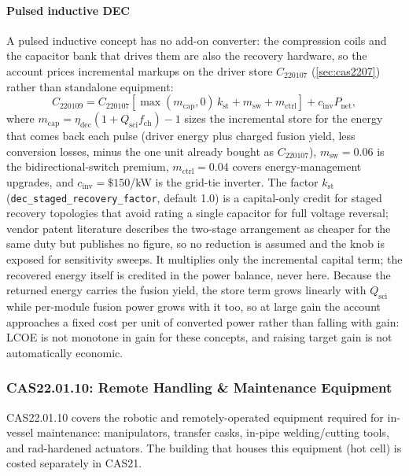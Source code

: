 \documentclass{article}
\begin{document}
\paragraph{Pulsed inductive DEC}
A pulsed inductive concept has no add-on converter: the compression
coils and the capacitor bank that drives them are also the recovery
hardware, so the account prices incremental markups on the driver store
$C_{220107}$ (\cref{sec:cas2207}) rather than standalone equipment:
\begin{equation}
\label{eq:cas2209-inductive}
  C_{220109} = C_{220107}\left[\max(m_{\text{cap}},0)\,k_{\text{st}}
  + m_{\text{sw}} + m_{\text{ctrl}}\right]
  + c_{\text{inv}} P_{\text{net}},
\end{equation}
where $m_{\text{cap}} = \eta_{\text{dec}}(1 + Q_{\text{sci}}
f_{\text{ch}}) - 1$ sizes the incremental store for the energy that
comes back each pulse (driver energy plus charged fusion yield, less
conversion losses, minus the one unit already bought as $C_{220107}$),
$m_{\text{sw}} = 0.06$ is the bidirectional-switch premium,
$m_{\text{ctrl}} = 0.04$ covers energy-management upgrades, and
$c_{\text{inv}} = \$150$/kW is the grid-tie inverter. The factor
$k_{\text{st}}$ (\texttt{dec\_staged\_recovery\_factor}, default 1.0)
is a capital-only credit for staged recovery topologies that avoid
rating a single capacitor for full voltage reversal; vendor patent
literature describes the two-stage arrangement as cheaper for the same
duty but publishes no figure, so no reduction is assumed and the knob
is exposed for sensitivity sweeps. It multiplies only the incremental
capital term; the recovered energy itself is credited in the power
balance, never here. Because the returned energy carries the fusion
yield, the store term grows linearly with $Q_{\text{sci}}$ while
per-module fusion power grows with it too, so at large gain the account
approaches a fixed cost per unit of converted power rather than falling
with gain: LCOE is not monotone in gain for these concepts, and raising
target gain is not automatically economic.

\subsubsection{CAS22.01.10: Remote Handling \& Maintenance Equipment}
\label{sec:cas2210}

CAS22.01.10 covers the robotic and remotely-operated equipment required
for in-vessel maintenance: manipulators, transfer casks, in-pipe
welding/cutting tools, and rad-hardened actuators. The building that
houses this equipment (hot cell) is costed separately in CAS21.
\end{document}
